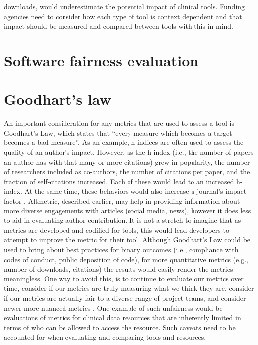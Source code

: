 \documentclass{article}
\begin{document}
downloads, would underestimate the potential impact of clinical tools. Funding agencies need to consider how each type of tool is context dependent and that impact should be measured and compared between tools with this in mind.  

\section{Software fairness evaluation}



\section{Goodhart’s law}
An important consideration for any metrics that are used to assess a tool is Goodhart’s Law, which states that “every measure which becomes a target becomes a bad measure\cite{hoskin_awful_1996}”. As an example, h-indices are often used to assess the quality of an author’s impact. However, as the h-index (i.e., the number of papers an author has with that many or more citations) grew in popularity, the number of researchers included as co-authors, the number of citations per paper, and the fraction of self-citations increased. Each of these would lead to an increased h-index. At the same time, these behaviors would also increase a journal’s impact factor \cite{fire_over-optimization_2019}. Altmetric, described earlier, may help in providing information about more diverse engagements with articles (social media, news), however it does less to aid in evaluating author contribution. It is not a stretch to imagine that as metrics are developed and codified for tools, this would lead developers to attempt to improve the metric for their tool. Although Goodhart’s Law could be used to bring about best practices for binary outcomes (i.e., compliance with codes of conduct, public deposition of code), for more quantitative metrics (e.g., number of downloads, citations) the results would easily render the metrics meaningless. One way to avoid this, is to continue to evaluate our metrics over time, consider if our metrics are truly measuring what we think they are, consider if our metrics are actually fair to a diverse range of project teams, and consider newer more nuanced metrics \cite{fire_over-optimization_2019}. One example of such unfairness would be evaluations of metrics for clinical data resources that are inherently limited in terms of who can be allowed to access the resource. Such caveats need to be accounted for when evaluating and comparing tools and resources.
\end{document}
